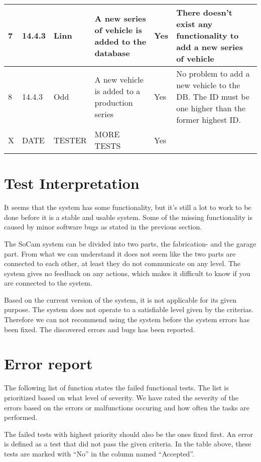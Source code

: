 \begin{center}
\begin{longtable}{| l | l | l | p{3cm}  | l | p{5cm} |}
	    7 & 14.4.3 & Linn & A new series of vehicle is added to the database & Yes & There doesn't exist any functionality to add a new series of vehicle \\ \hline
	    8 & 14.4.3 & Odd & A new vehicle is added to a production series & Yes & No problem to add a new vehicle to the DB. The ID must be one higher than the former highest ID. \\ \hline
	    X & DATE & TESTER & MORE TESTS & Yes &  \\ \hline

	    \hline
	    \end{longtable}
	\end{center}

	\section{Test Interpretation}

		It seems that the system has some functionality, but it’s still a lot to work to be done before it is a stable and usable system. Some of the missing functionality is caused by minor software bugs as stated in the previous section.

		The SoCam system can be divided into two parts, the fabrication- and the garage part. From what we can understand it does not seem like the two parts are connected to each other, at least they do not communicate on any level.  The system gives no feedback on any actions, which makes it difficult to know if you are connected to the system. 

		Based on the current version of the system, it is not applicable for its given purpose. The system does not operate to a satisfiable level given by the criterias. Therefore we can not recommend using the system before the system errors has been fixed. The discovered errors and bugs has been reported. 

	\clearpage
	\section{Error report}

		The following list of function states the failed functional tests. The list is prioritized based on what level of severity. We have rated the severity of the errors based on the errors or malfunctions occuring and how often the tasks are performed. 

		The failed tests with highest priority should also be the ones fixed first. An error is defined as a test that did not pass the given criteria. In the table above, these tests are marked with “No” in the column named “Accepted”. 

